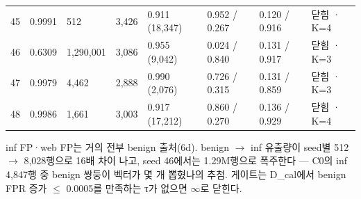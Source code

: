\begin{landscape}
\begin{longtable}
{}45 & 0.9991 & 512 & 3,426 & 0.911 (18,347) & 0.952 /\allowbreak{} 0.267 & 0.120 /\allowbreak{} 0.916 & 닫힘 · K=\allowbreak{}4 \\
{}46 & 0.6309 & 1,290,001 & 3,086 & 0.955 (9,042) & 0.024 /\allowbreak{} 0.840 & 0.131 /\allowbreak{} 0.917 & 닫힘 · K=\allowbreak{}3 \\
{}47 & 0.9979 & 4,462 & 2,888 & 0.990 (2,076) & 0.726 /\allowbreak{} 0.315 & 0.131 /\allowbreak{} 0.859 & 닫힘 · K=\allowbreak{}3 \\
{}48 & 0.9986 & 1,661 & 3,003 & 0.917 (17,212) & 0.860 /\allowbreak{} 0.270 & 0.136 /\allowbreak{} 0.929 & 닫힘 · K=\allowbreak{}4 \\
\bottomrule
\end{longtable}
\endgroup
\end{landscape}
inf FP·web FP는 거의 전부 benign 출처(6d). benign \ensuremath{\rightarrow} inf 유출량이 seed별 512  \ensuremath{\rightarrow}  8,028행으로 16배 차이 나고, seed 46에서는 1.29M행으로 폭주한다 — C0의 inf 4,847행 중 benign 쌍둥이 벡터가 몇 개 뽑혔나의 추첨. 게이트는 D\_\allowbreak{}cal에서 benign FPR 증가 \ensuremath{\leq} 0.0005를 만족하는 τ가 없으면 \ensuremath{\infty}로 닫힌다.

